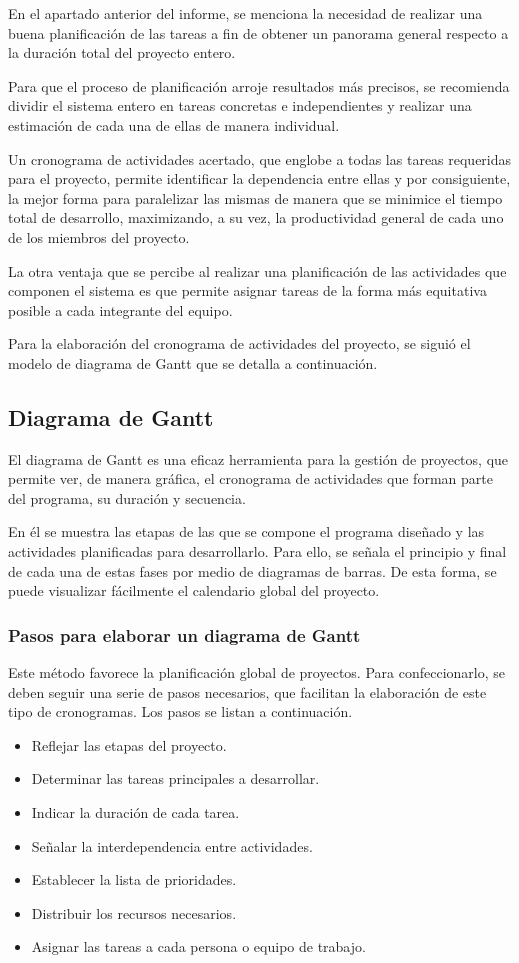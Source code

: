 En el apartado anterior del informe, se menciona la necesidad de realizar una buena planificación de las tareas a fin de obtener un panorama general respecto a la duración total del proyecto entero.

Para que el proceso de planificación arroje resultados más precisos, se recomienda dividir el sistema entero en tareas concretas e independientes y realizar una estimación de cada una de ellas de manera individual.

Un cronograma de actividades acertado, que englobe a todas las tareas requeridas para el proyecto, permite identificar la dependencia entre ellas y por consiguiente, la mejor forma para paralelizar las mismas de manera que se minimice el tiempo total de desarrollo, maximizando, a su vez, la productividad general de cada uno de los miembros del proyecto.

La otra ventaja que se percibe al realizar una planificación de las actividades que componen el sistema es que permite asignar tareas de la forma más equitativa posible a cada integrante del equipo.

Para la elaboración del cronograma de actividades del proyecto, se siguió el modelo de diagrama de Gantt que se detalla a continuación.

\subsection{Diagrama de Gantt}
El diagrama de Gantt es una eficaz herramienta para la gestión de proyectos, que permite ver, de manera gráfica, el cronograma de actividades que forman parte del programa, su duración y secuencia.

En él se muestra las etapas de las que se compone el programa diseñado y las actividades planificadas para desarrollarlo. Para ello, se señala el principio y final de cada una de estas fases por medio de diagramas de barras. De esta forma, se puede visualizar  fácilmente  el calendario global del proyecto.

\subsubsection{Pasos para elaborar un diagrama de Gantt}
Este método favorece la planificación global de proyectos. Para confeccionarlo, se deben seguir una serie de pasos necesarios, que facilitan la elaboración de este tipo de cronogramas. Los pasos se listan a continuación.

\begin{itemize}
	\item Reflejar las etapas del proyecto.
	\item Determinar las tareas principales a desarrollar.
	\item Indicar la duración de cada tarea.
	\item Señalar la interdependencia entre actividades.
	\item Establecer la lista de prioridades.
	\item Distribuir los recursos necesarios.
	\item Asignar las tareas a cada persona o equipo de trabajo.
\end{itemize}

